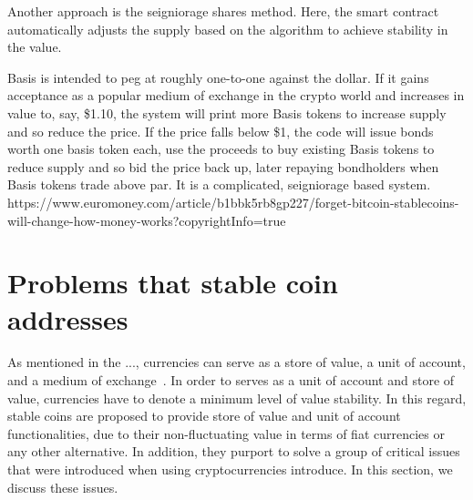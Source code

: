 
Another approach is the seigniorage shares method\cite{overview}. Here, the smart contract automatically adjusts the supply based on the algorithm to achieve stability in the value.

Basis is intended to peg at roughly one-to-one against the dollar. If it gains acceptance as a popular medium of exchange in the crypto world and increases in value to, say, \$1.10, the system will print more Basis tokens to increase supply and so reduce the price.  If the price falls below \$1, the code will issue bonds worth one basis token each, use the proceeds to buy existing Basis tokens to reduce supply and so bid the price back up, later repaying bondholders when Basis tokens trade above par.  It is a complicated, seigniorage based system.
https://www.euromoney.com/article/b1bbk5rb8gp227/forget-bitcoin-stablecoins-will-change-how-money-works?copyrightInfo=true


\section{Problems that stable coin addresses}
As mentioned in the ..., currencies can serve as a store of value, a unit of account, and a medium of exchange~\cite{smithin2002money}. In order to serves as a unit of account and store of value, currencies have to denote a minimum level of value stability. In this regard, stable coins are proposed to provide store of value and unit of account functionalities, due to their non-fluctuating value in terms of fiat currencies or any other alternative. In addition, they purport to solve a group of critical issues that were introduced when using cryptocurrencies introduce. In this section, we discuss these issues.


